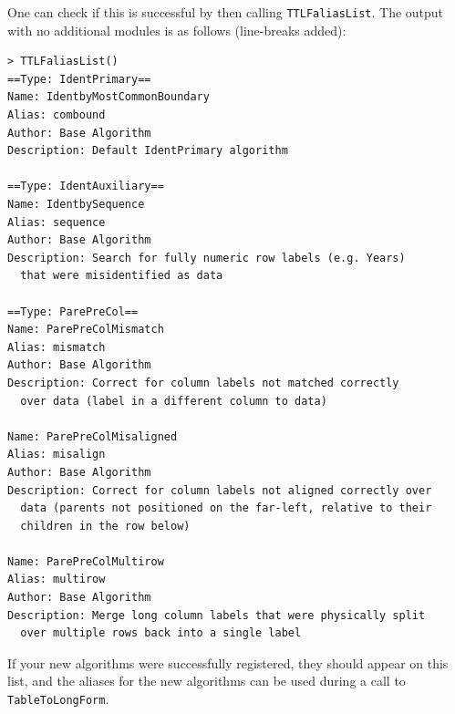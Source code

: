 \documentclass[a4paper]{article}
\begin{document}
One can check if this is successful by then calling
\verb|TTLFaliasList|. The output with no additional modules is as
follows (line-breaks added):
\begin{verbatim}
> TTLFaliasList()
==Type: IdentPrimary==
Name: IdentbyMostCommonBoundary
Alias: combound
Author: Base Algorithm
Description: Default IdentPrimary algorithm

==Type: IdentAuxiliary==
Name: IdentbySequence
Alias: sequence
Author: Base Algorithm
Description: Search for fully numeric row labels (e.g. Years)
  that were misidentified as data

==Type: ParePreCol==
Name: ParePreColMismatch
Alias: mismatch
Author: Base Algorithm
Description: Correct for column labels not matched correctly
  over data (label in a different column to data)

Name: ParePreColMisaligned
Alias: misalign
Author: Base Algorithm
Description: Correct for column labels not aligned correctly over
  data (parents not positioned on the far-left, relative to their
  children in the row below)

Name: ParePreColMultirow
Alias: multirow
Author: Base Algorithm
Description: Merge long column labels that were physically split
  over multiple rows back into a single label
\end{verbatim}
If your new algorithms were successfully registered, they should
appear on this list, and the aliases for the new algorithms can be
used during a call to \verb|TableToLongForm|.
\end{document}
